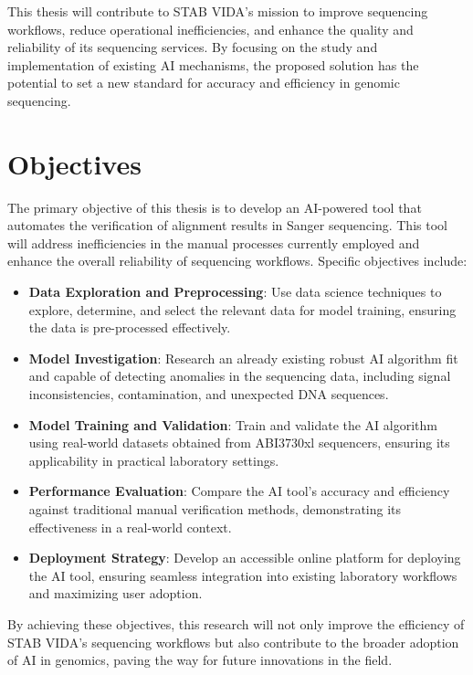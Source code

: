 This thesis will contribute to STAB VIDA’s mission to improve sequencing workflows, reduce operational inefficiencies, and enhance the quality and reliability of its sequencing services. By focusing on the study and implementation of existing AI mechanisms, the proposed solution has the potential to set a new standard for accuracy and efficiency in genomic sequencing.

\section{Objectives}
\label{sec:Objectives}

The primary objective of this thesis is to develop an AI-powered tool that automates the verification of alignment results in Sanger sequencing. This tool will address inefficiencies in the manual processes currently employed and enhance the overall reliability of sequencing workflows. Specific objectives include:

\begin{itemize}
  \item \textbf{Data Exploration and Preprocessing}: Use data science techniques to explore, determine, and select the relevant data for model training, ensuring the data is pre-processed effectively.
  \item \textbf{Model Investigation}: Research an already existing robust AI algorithm fit and capable of detecting anomalies in the sequencing data, including signal inconsistencies, contamination, and unexpected DNA sequences.
  \item \textbf{Model Training and Validation}: Train and validate the AI algorithm using real-world datasets obtained from ABI3730xl sequencers, ensuring its applicability in practical laboratory settings.
  \item \textbf{Performance Evaluation}: Compare the AI tool's accuracy and efficiency against traditional manual verification methods, demonstrating its effectiveness in a real-world context.
  \item \textbf{Deployment Strategy}: Develop an accessible online platform for deploying the AI tool, ensuring seamless integration into existing laboratory workflows and maximizing user adoption.
\end{itemize}

By achieving these objectives, this research will not only improve the efficiency of STAB VIDA’s sequencing workflows but also contribute to the broader adoption of AI in genomics, paving the way for future innovations in the field.


